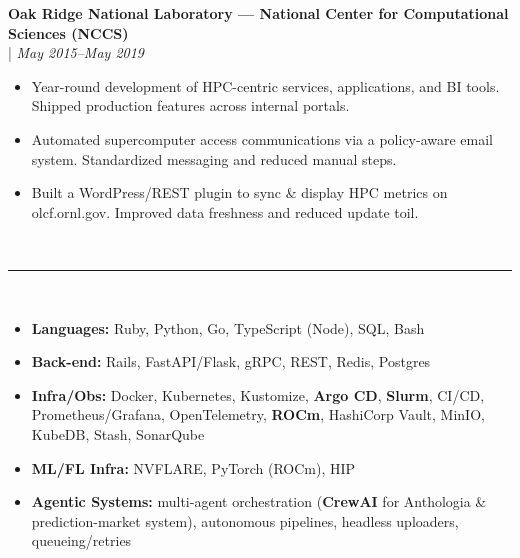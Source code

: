\documentclass[11pt,a4paper]{article}
\newcommand{\resumesection}[1]{
    \vspace{3pt}                                    %
    \noindent{\fontsize{13}{15}\selectfont\textbf{#1}}\\[-8pt]                    %
    \noindent\textcolor{gray}{\rule{\textwidth}{2pt}}\\[-10pt]  %
}
\newcommand{\regbullet}[1]{
    \item {\fontsize{10}{12}\selectfont #1}
}
\begin{document}
\vspace{8pt}
\noindent\textbf{Oak Ridge National Laboratory — National Center for Computational Sciences (NCCS)}\\
  |  {\fontsize{10}{12}\selectfont\textit{May 2015--May 2019}}
\begin{itemize}[leftmargin=18pt,itemsep=1pt,topsep=0pt]
\regbullet{Year-round development of HPC-centric services, applications, and BI tools. Shipped production features across internal portals.}

\regbullet{Automated supercomputer access communications via a policy-aware email system. Standardized messaging and reduced manual steps.}

\regbullet{Built a WordPress/REST plugin to sync \& display HPC metrics on olcf.ornl.gov. Improved data freshness and reduced update toil.}
\end{itemize}


\resumesection{SKILLS}

\begin{itemize}[leftmargin=18pt,itemsep=1pt,topsep=0pt]
\regbullet{\textbf{Languages:} Ruby, Python, Go, TypeScript (Node), SQL, Bash}

\regbullet{\textbf{Back-end:} Rails, FastAPI/Flask, gRPC, REST, Redis, Postgres}

\regbullet{\textbf{Infra/Obs:} Docker, Kubernetes, Kustomize, \textbf{Argo CD}, \textbf{Slurm}, CI/CD, Prometheus/Grafana, OpenTelemetry, \textbf{ROCm}, HashiCorp Vault, MinIO, KubeDB, Stash, SonarQube}

\regbullet{\textbf{ML/FL Infra:} NVFLARE, PyTorch (ROCm), HIP}

\regbullet{\textbf{Agentic Systems:} multi-agent orchestration (\textbf{CrewAI} for Anthologia \& prediction-market system), autonomous pipelines, headless uploaders, queueing/retries}
\end{itemize}

\end{document}
